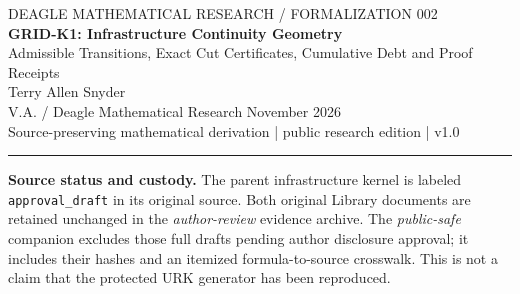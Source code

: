 \documentclass[11pt,letterpaper]{article}
\theoremstyle{definition}\newtheorem{definition}[theorem]{Definition}\newtheorem{example}[theorem]{Example}
\theoremstyle{remark}\newtheorem{remark}[theorem]{Remark}
\begin{document}
\begin{center}
{\small\color{gold}\MakeUppercase{Deagle Mathematical Research / Formalization 002}}\\[10pt]
{\LARGE\bfseries GRID-K1: Infrastructure Continuity Geometry}\\[5pt]
{\large Admissible Transitions, Exact Cut Certificates,\; Cumulative Debt and Proof Receipts}\\[11pt]
{\large Terry Allen Snyder}\\[4pt]
{\small V.A. / Deagle Mathematical Research  November 2026}\\[8pt]
{\small\color{muted}Source-preserving mathematical derivation | public research edition | v1.0}
\end{center}
\vspace{5pt}\hrule\vspace{11pt}
\begin{abstract}
The author-held \emph{World Kernel Atlas} identifies GRID-K1 as an infrastructure continuity kernel, and the separate \emph{Critical Infrastructure Continuity Kernel v1.0} describes authority-bound continuation, degradation, rerouting, escalation, halt and refusal across coupled power, water, telecommunications and civic services. This manuscript extracts a precise, testable mathematical layer without treating the source design proposal as already-proved deployment. We introduce a finite directed service-capacity network with dependency constraints, nonnegative cumulative debt, freshness and authority predicates, and a pre-effect admissibility guard. We prove a necessary cut-capacity obstruction, give a constructive sufficiency certificate through admissible flows, prove conditional invariant preservation under enforced guards, and show no return to a strict debt reserve absent an explicit reset law. A frozen seven-case synthetic example is computed with exact rational arithmetic, seven proposition-scoped certificates and seven chained receipts. These results certify the specified finite model and example; they do not establish the behavior of a physical electrical grid, an installed protection controller or an unrestricted universal cascade-prevention theorem.
\end{abstract}
\textbf{Source status and custody.} The parent infrastructure kernel is labeled \texttt{approval\_draft} in its original source. Both original Library documents are retained unchanged in the \emph{author-review} evidence archive. The \emph{public-safe} companion excludes those full drafts pending author disclosure approval; it includes their hashes and an itemized formula-to-source crosswalk. This is not a claim that the protected URK generator has been reproduced.
\end{document}
